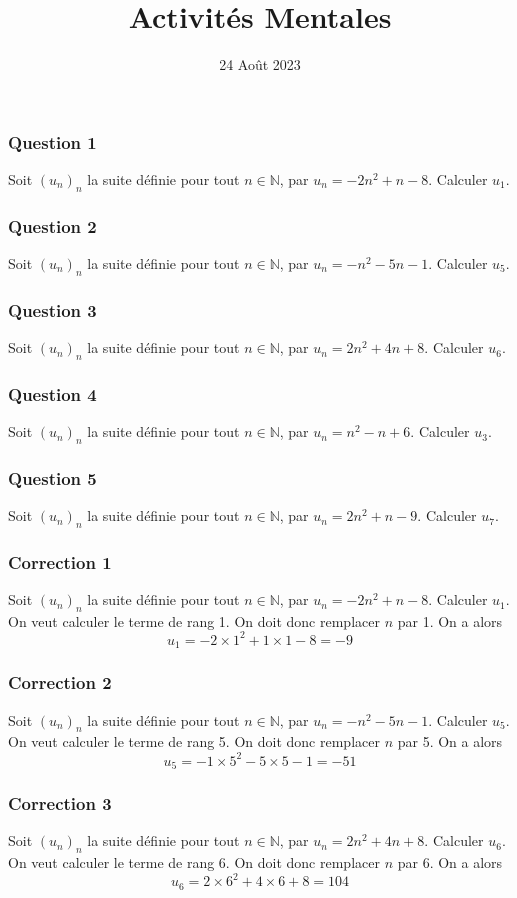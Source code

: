 \documentclass[15pt, mathserif]{beamer}
\title{Activités Mentales}
\date{24 Août 2023}
\newcommand{\N}{\mathbb{N}}			%
\begin{document}
\begin{frame}
    \titlepage
\end{frame}

\begin{frame} 
	\frametitle{Question 1}
Soit $(u_n)_n$ la suite définie pour tout $n \in \N$, par $u_n=-2n^2+n-8$. Calculer $u_{1}$.\end{frame}


\begin{frame} 
	\frametitle{Question 2}
Soit $(u_n)_n$ la suite définie pour tout $n \in \N$, par $u_n=-n^2-5n-1$. Calculer $u_{5}$.\end{frame}


\begin{frame} 
	\frametitle{Question 3}
Soit $(u_n)_n$ la suite définie pour tout $n \in \N$, par $u_n=2n^2+4n+8$. Calculer $u_{6}$.\end{frame}


\begin{frame} 
	\frametitle{Question 4}
Soit $(u_n)_n$ la suite définie pour tout $n \in \N$, par $u_n=n^2-n+6$. Calculer $u_{3}$.\end{frame}


\begin{frame} 
	\frametitle{Question 5}
Soit $(u_n)_n$ la suite définie pour tout $n \in \N$, par $u_n=2n^2+n-9$. Calculer $u_{7}$.\end{frame}


\begin{frame}
\vspace{-10mm}
	\frametitle{Correction 1}
Soit $(u_n)_n$ la suite définie pour tout $n \in \N$, par $u_n=-2n^2+n-8$. Calculer $u_{1}$. 
 \vfil 
  On veut calculer le terme de rang 1. 
 \vfil 
 On doit donc remplacer $n$ par 1. On a alors $$u_{1}=-2\times 1^2+1\times1-8=-9$$\end{frame}


\begin{frame}
\vspace{-10mm}
	\frametitle{Correction 2}
Soit $(u_n)_n$ la suite définie pour tout $n \in \N$, par $u_n=-n^2-5n-1$. Calculer $u_{5}$. 
 \vfil 
  On veut calculer le terme de rang 5. 
 \vfil 
 On doit donc remplacer $n$ par 5. On a alors $$u_{5}=-1\times 5^2-5\times5-1=-51$$\end{frame}


\begin{frame}
\vspace{-10mm}
	\frametitle{Correction 3}
Soit $(u_n)_n$ la suite définie pour tout $n \in \N$, par $u_n=2n^2+4n+8$. Calculer $u_{6}$. 
 \vfil 
  On veut calculer le terme de rang 6. 
 \vfil 
 On doit donc remplacer $n$ par 6. On a alors $$u_{6}=2\times 6^2+4\times6+8=104$$\end{frame}
\end{document}
